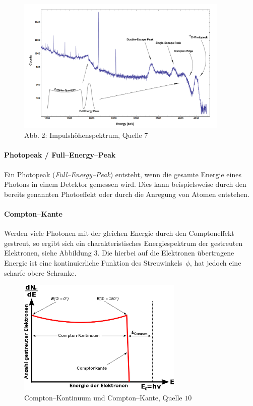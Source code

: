 \documentclass[12pt,a4paper]{scrartcl}
\numberwithin{equation}{section} %
\renewcommand{\[}{} %
\renewcommand{\]}{\noindent} %
\begin{document}
\begin{figure}
	\centering
	\includegraphics[width=0.9\textwidth]{../media/B3.4/Am_Be_SourceSpectrum.jpg}
	\caption{Abb. 2: Impulshöhenspektrum, Quelle \(7\)}
	\label{abb:Impulshoehenspektrum}
\end{figure}

\hypertarget{photopeak-fullenergypeak}{%
\paragraph{Photopeak /
Full--Energy--Peak}\label{photopeak-fullenergypeak}}

Ein Photopeak (\emph{Full--Energy--Peak}) entsteht, wenn die gesamte
Energie eines Photons in einem Detektor gemessen wird. Dies kann
beispielsweise durch den bereits genannten Photoeffekt oder durch die
Anregung von Atomen entstehen.

\hypertarget{comptonkante}{%
\paragraph{Compton--Kante}\label{comptonkante}}

Werden viele Photonen mit der gleichen Energie durch den Comptoneffekt
gestreut, so ergibt sich ein charakteristisches Energiespektrum der
gestreuten Elektronen, siehe Abbildung \(3\). Die hierbei auf die
Elektronen übertragene Energie ist eine kontinuierliche Funktion des
Streuwinkels~\(\phi\), hat jedoch eine scharfe obere Schranke.

\begin{figure}
	\centering
	\includegraphics[width=0.7\textwidth]{../media/B3.4/Comptonspektrum.jpg}
	\caption{Compton--Kontinuum und Compton--Kante, Quelle \(10\)}
	\label{abb:Compton-Kante}
\end{figure}
\end{document}
